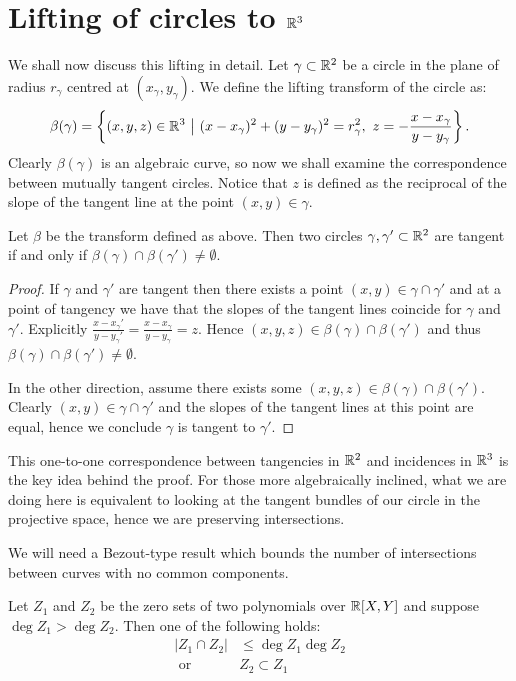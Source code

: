 \section{Lifting of circles to $\mathbb R^3$}

We shall now discuss this lifting in detail. Let $\gamma \subset \mathbb R^2$ be a circle in the plane of radius $r_{\gamma}$ centred at $(x_\gamma, y_\gamma)$. 
We define the lifting transform of the circle as: \[
    \beta(\gamma) = \left \{ (x,y,z) \in \mathbb R^3 \ \big | \ (x-x_\gamma)^2 + (y-y_\gamma)^2 = r_\gamma^2, \ z = - \frac{x-x_\gamma}{y-y_\gamma} \right \}.
\]  
Clearly $\beta(\gamma)$ is an algebraic curve, so now we shall examine the correspondence between mutually tangent circles. Notice that $z$ is defined as the reciprocal of the slope of the tangent line
at the point $(x,y) \in \gamma$.

\begin{lemma}
    Let $\beta$ be the transform defined as above. 
    Then two circles $\gamma, \gamma' \subset \mathbb R^2$ are tangent if and only if $\beta(\gamma) \cap \beta(\gamma') \neq \emptyset$.    \label{lem:beta-lift}
\end{lemma}
\begin{proof}
If $\gamma$ and $\gamma'$ are tangent then there exists a point $(x,y) \in \gamma \cap \gamma'$ and
at a point of tangency we have that the slopes of the tangent lines coincide for $\gamma$ and $\gamma'$. Explicitly $\frac{x-x_\gamma'}{y - y_\gamma'}= \frac{x-x_\gamma}{y - y_\gamma} = z$.
Hence $(x,y,z) \in \beta(\gamma) \cap \beta(\gamma')$ and thus $ \beta(\gamma) \cap \beta(\gamma') \neq \emptyset$.

In the other direction, assume there exists some $(x,y,z) \in \beta(\gamma) \cap \beta(\gamma')$. 
Clearly $(x,y) \in \gamma \cap \gamma'$ and the slopes of the tangent lines at this point are equal,
hence we conclude $\gamma$ is tangent to $\gamma'$.
\end{proof}
This one-to-one correspondence between tangencies in $\mathbb R^2$ and incidences in $\mathbb R^3$ is the key idea behind the proof. 
For those more algebraically inclined, what we are doing here is equivalent to looking at the tangent bundles of our circle in the projective space, hence we 
are preserving intersections.

We will need a Bezout-type result which bounds the number of intersections between curves with no common components.
\begin{lemma}     \label{lem:Bezout}
   Let $Z_1$ and $Z_2$ be the zero sets of two polynomials over $\mathbb R[X,Y]$ and suppose $\deg Z_1 > \deg Z_2$. Then one of the following holds:
   \begin{align*}
    |Z_1 \cap Z_2 | &\leq \deg Z_1 \deg Z_2 \\
    \text{ or } &Z_2 \subset Z_1
   \end{align*}
\end{lemma}


